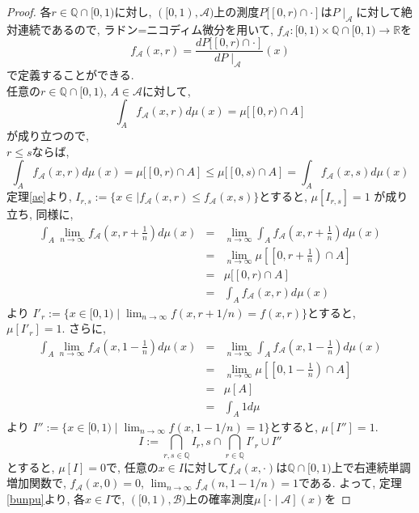 \documentclass[a4paper,12pt]{jsarticle}
\theoremstyle{break}
\begin{document}
\begin{proof}
各$r\in\mathbb{Q}\cap[0,1)$に対し, $([0,1),\mathcal{A})$上の測度$P[[0,r)\cap\cdot]$は$P\mid_{\mathcal{A}}$に対して絶対連続であるので, ラドン=ニコディム微分を用いて, 
$f_\mathcal{A}:[0,1)\times\mathbb{Q}\cap[0,1)\to\mathbb{R}$を
\begin{equation*}
f_\mathcal{A}(x,r)=\frac{dP[[0,r)\cap\cdot]}{dP\mid_{\mathcal{A}}}(x)
\end{equation*}
で定義することができる.\\
任意の$r\in\mathbb{Q}\cap[0,1)$, $A\in\mathcal{A}$に対して, 
\begin{equation*}
\int_A f_\mathcal{A}(x,r) d\mu(x)=\mu[[0,r)\cap A]
\end{equation*}
が成り立つので, \\
$r\leq s$ならば, 
\begin{equation*}
\int_A f_\mathcal{A}(x,r) d\mu(x)
=\mu[[0,r)\cap A]
\leq\mu[[0,s)\cap A]
=\int_A f_\mathcal{A}(x,s) d\mu(x)
\end{equation*}
定理\ref{ae}より, 
$I_{r,s}:=\{x\in\mid f_\mathcal{A}(x,r)\leq f_\mathcal{A}(x,s)\}$とすると, $\mu[I_{r,s}]=1$
が成り立ち, 同様に,
\begin{eqnarray*}
\int_A \lim_{n\to\infty} f_\mathcal{A}\left(x,r+\frac{1}{n}\right) d\mu(x)
&=&
\lim_{n\to\infty} \int_A  f_\mathcal{A}\left(x,r+\frac{1}{n}\right) d\mu(x)\\
&=&
\lim_{n\to\infty}\mu\left[\left[0,r+\frac{1}{n}\right)\cap A \right]\\
&=&
\mu[[0,r)\cap A]\\
&=&
\int_A f_\mathcal{A}(x,r) d\mu(x)
\end{eqnarray*}
より
$I'_r:=\{x\in [0,1) \mid \lim_{n\to\infty}f(x,r+1/n)=f(x,r)\}$とすると, $\mu[I'_r]=1$.
さらに, 
\begin{eqnarray*}
\int_A \lim_{n\to\infty} f_\mathcal{A}\left(x,1-\frac{1}{n}\right) d\mu(x)
&=&
\lim_{n\to\infty} \int_A  f_\mathcal{A}\left(x,1-\frac{1}{n}\right) d\mu(x)\\
&=&
\lim_{n\to\infty}\mu\left[\left[0,1-\frac{1}{n}\right)\cap A \right]\\
&=&
\mu[A]\\
&=&
\int_A 1 d\mu
\end{eqnarray*}
より
$I'':=\{x\in [0,1) \mid \lim_{n\to\infty}f(x,1-1/n)=1\}$とすると, $\mu[I'']=1$.
\begin{equation*}
I:=\bigcap_{r,s\in\mathbb{Q}}I_r,s\cap\bigcap_{r\in\mathbb{Q}}I'_r\cup I''
\end{equation*}
とすると, $\mu[I]=0$で, 任意の$x\in I$に対して$f_\mathcal{A}(x,\cdot)$は$\mathbb{Q}\cap[0,1)$上で右連続単調増加関数で, $f_\mathcal{A}(x,0)=0$, $\lim_{n\to\infty}f_\mathcal{A}(n,1-1/n)=1$である. よって, 定理\ref{bunpu}より, 各$x\in I$で, $([0,1),\mathcal{B})$上の確率測度$\mu[\cdot\mid\mathcal{A}](x)$を

\end{proof}
\end{document}
